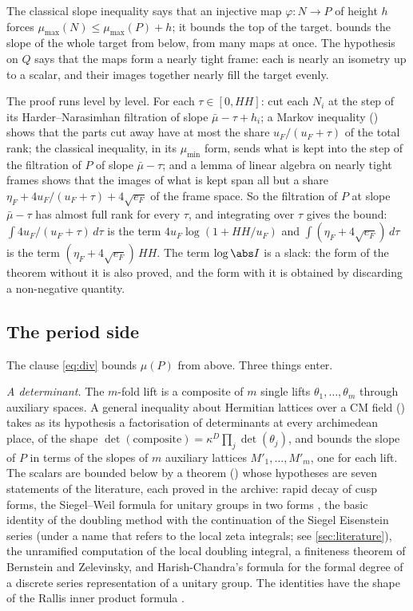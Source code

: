 The classical slope inequality says that an injective map $\varphi\colon N\to P$ of height $h$
forces $\mu_{\max}(N)\le\mu_{\max}(P)+h$; it bounds the top of the target.  bounds
the slope of the whole target from below, from many maps at once. The hypothesis on $Q$ says
that the maps form a nearly tight frame: each is nearly an isometry up to a scalar, and their
images together nearly fill the target evenly.

The proof runs level
by level. For each $\tau\in[0,HH]$: cut each $N_i$ at the step of its Harder--Narasimhan
filtration of slope $\bar\mu-\tau+h_i$; a Markov inequality () shows that the parts
cut away have at most the share $u_F/(u_F+\tau)$ of the total rank; the classical inequality, in
its $\mu_{\min}$ form, sends what is kept into the step of the filtration of $P$ of slope
$\bar\mu-\tau$; and a lemma of linear algebra on nearly tight frames shows that the images of what is
kept span all but a share $\eta_F+4u_F/(u_F+\tau)+4\sqrt{e_F}$ of the frame space. So the filtration of
$P$ at slope $\bar\mu-\tau$ has almost full rank for every $\tau$, and integrating over $\tau$ gives
the bound: $\int4u_F/(u_F+\tau)\,d\tau$ is the term $4u_F\log(1+HH/u_F)$ and $\int(\eta_F+4\sqrt{e_F})\,d\tau$
is the term $(\eta_F+4\sqrt{e_F})\,HH$. The term $\log\abs I$ is a slack: the form of the theorem
without it is also proved, and the form with it is obtained by discarding a non-negative
quantity.

\subsection{The period side}\label{sec:period}
The clause \eqref{eq:div} bounds $\mu(P)$ from above. Three things enter.

\emph{A determinant.} The $m$-fold lift is a composite of $m$ single lifts
$\theta_1,\dots,\theta_m$ through auxiliary spaces. A general inequality about Hermitian
lattices over a CM field \lvS{} () takes as its hypothesis a factorisation of
determinants at every archimedean place, of the shape
$\det(\text{composite})=\kappa^{D}\prod_j\det(\theta_j)$, and bounds the slope of $P$ in terms
of the slopes of $m$ auxiliary lattices $M'_1,\dots,M'_m$, one for each lift. The scalars are
bounded below by a theorem \lvS{} () whose hypotheses are
seven statements of the literature, each proved in the archive: rapid decay of cusp forms,
the Siegel--Weil formula for unitary groups in two forms
\cite{weil1965,ichino2004,ichino2007}, the basic identity of the doubling method
\cite{psrallis1987} with the continuation of the Siegel Eisenstein series (under a name that
refers to the local zeta integrals; see \cref{sec:literature}), the unramified computation of
the local doubling integral, a finiteness theorem of Bernstein and Zelevinsky, and
Harish-Chandra's formula for the formal degree of a discrete series representation of a
unitary group. The identities have
the shape of the Rallis inner product formula \cite{rallis1984}.

